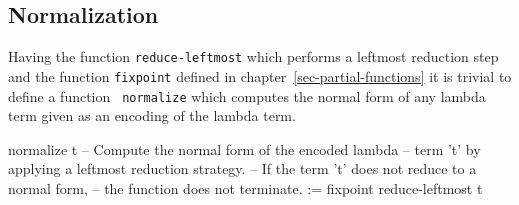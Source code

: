 \documentclass[12pt]{article}
\begin{document}
\subsection{Normalization}
\label{sec-normalization}

Having the function {\tt reduce-leftmost} which performs a leftmost reduction
step and the function {\tt fixpoint} defined in
chapter~\ref{sec-partial-functions} it is trivial to define a function {\tt
normalize} which computes the normal form of any lambda term given as an
encoding of the lambda term.

\begin{lam}
    normalize t
        -- Compute the normal form of the encoded lambda
        -- term 't' by applying a leftmost reduction strategy.
        -- If the term 't' does not reduce to a normal form,
        -- the function does not terminate.
    :=
        fixpoint reduce-leftmost t
\end{lam}











{}

\end{document}
